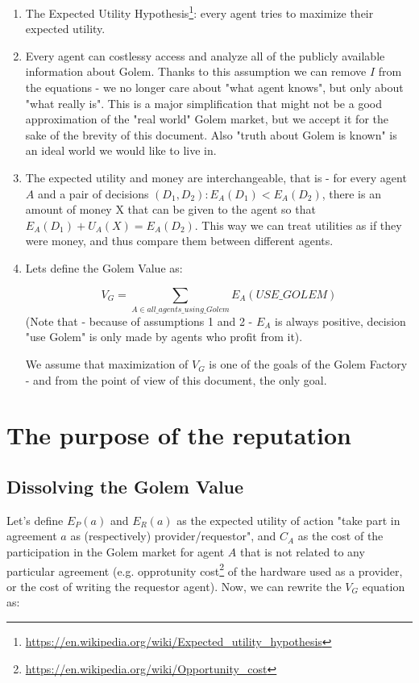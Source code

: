\documentclass{article}
\begin{document}
\begin{enumerate}
\item The Expected Utility Hypothesis\footnote{\href{https://en.wikipedia.org/wiki/Expected\_utility\_hypothesis}{https://en.wikipedia.org/wiki/Expected\_utility\_hypothesis}}: every agent tries to maximize their expected utility.

\item Every agent can costlessy access and analyze all of the publicly available information about Golem. Thanks to this assumption we can remove $I$ from the equations - we no longer
    care about "what agent knows", but only about "what really is". This is a major simplification that might not be a good approximation of the "real world" Golem market, but we
    accept it for the sake of the brevity of this document. Also "truth about Golem is known" is an ideal world we would like to live in.

\item The expected utility and money are interchangeable, that is - for every agent $A$ and a pair of decisions $(D_1, D_2): E_A(D_1) < E_A(D_2)$, there is an amount of money X that
    can be given to the agent so that $E_A(D_1) + U_A(X) = E_A(D_2)$. This way we can treat utilities as if they were money, and thus compare them between different agents.

\item Lets define the Golem Value as:

\begin{equation}
    V_G = \sum_{A \in all\_agents\_using\_Golem}E_A(USE\_GOLEM)
\end{equation}
(Note that - because of assumptions 1 and 2 - $E_A$ is always positive, decision "use Golem" is only made by agents who profit from it).

We assume that maximization of $V_G$ is one of the goals of the Golem Factory - and from the point of view of this document, the only goal.
\end{enumerate}

\section{The purpose of the reputation}
\subsection{Dissolving the Golem Value}

Let's define $E_P(a)$ and $E_R(a)$ as the expected utility of action "take part in agreement $a$ as (respectively) provider/requestor", and $C_A$ as the cost of
the participation in the Golem market for agent $A$ that is not related to any particular agreement 
(e.g. opprotunity cost\footnote{\href{https://en.wikipedia.org/wiki/Opportunity\_cost}{https://en.wikipedia.org/wiki/Opportunity\_cost}} of the hardware used as a provider, 
or the cost of writing the requestor agent). Now, we can rewrite the $V_G$ equation as:
\end{document}
